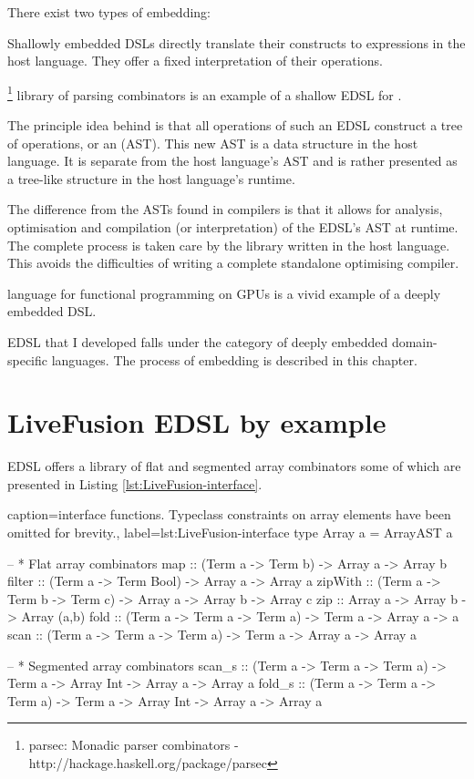 \documentclass[preamble.tex]{subfiles}
\begin{document}
There exist two types of embedding:
\begin{description}
\item {}

Shallowly embedded DSLs directly translate their constructs to expressions in the host language. They offer a fixed interpretation of their operations.

\footnote{parsec: Monadic parser combinators - http://hackage.haskell.org/package/parsec} library of parsing combinators is an example of a shallow EDSL for \Haskell.

\item {} 

The principle idea behind  is that all operations of such an EDSL construct a tree of operations, or an  (AST)\iast{}. This new AST is a data structure in the host language. It is separate from the host language's AST and is rather presented as a tree-like structure in the host language's runtime.

The difference from the ASTs found in compilers is that it allows for analysis, optimisation and compilation (or interpretation) of the EDSL's AST at runtime. The complete process is taken care by the library written in the host language. This avoids the difficulties of writing a complete standalone optimising compiler.

 language for functional programming on GPUs \cite{CKL+11} is a vivid example of a deeply embedded DSL.
\end{description}

\LiveFusion EDSL that I developed falls under the category of deeply embedded domain-specific languages. The process of embedding is described in this chapter.


\section{LiveFusion EDSL by example}

\LiveFusion EDSL offers a library of flat and segmented\isegmented{} array combinators\icomb{} some of which are presented in Listing \ref{lst:LiveFusion-interface}.

\begin{hscode2}{%
    caption={\LiveFusion interface functions. Typeclass constraints on array elements have been omitted for brevity.},%
    label=lst:LiveFusion-interface}
type Array a = ArrayAST a

-- * Flat array combinators
map      :: (Term a -> Term b) -> Array a -> Array b
filter   :: (Term a -> Term Bool) -> Array a -> Array a
zipWith  :: (Term a -> Term b -> Term c) -> Array a -> Array b -> Array c
zip      :: Array a -> Array b -> Array (a,b)
fold     :: (Term a -> Term a -> Term a) -> Term a -> Array a -> a
scan     :: (Term a -> Term a -> Term a) -> Term a -> Array a -> Array a

-- * Segmented array combinators
scan_s   :: (Term a -> Term a -> Term a) -> Term a
         -> Array Int -> Array a -> Array a
fold_s   :: (Term a -> Term a -> Term a) -> Term a
         -> Array Int -> Array a -> Array a
\end{hscode2}
\end{document}
